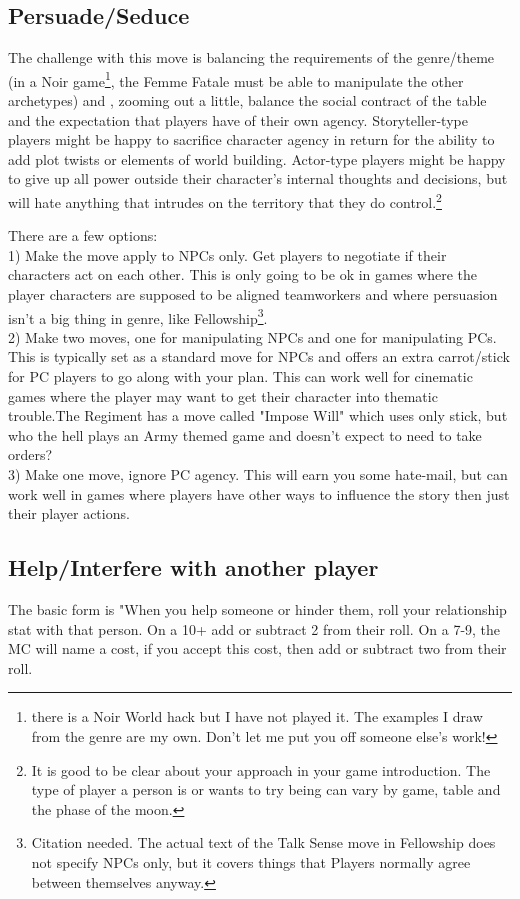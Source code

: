 \documentclass{tufte-handout}
\begin{document}
\subsection{Persuade/Seduce}
The challenge with this move is  balancing the requirements of the genre/theme (in a Noir game\footnote{there is a Noir World hack but I have not played it. The examples I draw from the genre are my own. Don't let me put you off someone else's work!}, the Femme Fatale must be able to manipulate the other archetypes) and , zooming out a little, balance the social contract of the table and the expectation that players have of their own agency. Storyteller-type players might be happy to sacrifice character agency in return for the ability to add plot twists or elements of world building. Actor-type players might be happy to give up all power outside their character's internal thoughts and decisions, but will hate anything that intrudes on the territory that they do control.\footnote{It is good to be clear about your approach in your game introduction. The type of player a person is or wants to try being can vary by game, table and the phase of the moon.}

There are a few options:\\
1) Make the move apply to NPCs only. Get players to negotiate if their characters act on each other. This is only going to be ok in games where the player characters are supposed to be aligned teamworkers and where persuasion isn't a big thing in genre, like Fellowship\footnote{Citation needed. The actual text of the Talk Sense move in Fellowship does not specify NPCs only, but it covers things that Players normally agree between themselves anyway.}. \\
2) Make two moves, one for manipulating NPCs and one for manipulating PCs. This is typically set as a standard move for NPCs and offers an extra carrot/stick for PC players to go along with your plan. This can work well for cinematic games where the player may want to get their character into thematic trouble.The Regiment has a move called "Impose Will" which uses only stick, but who the hell plays an Army themed game and doesn't expect to need to take orders?\\
3) Make one move, ignore PC agency. This will earn you some hate-mail, but can work well in games where players have other ways to influence the story then just their player actions. 

\subsection{Help/Interfere with another player}
The basic form is "When you help someone or hinder them, roll your relationship stat with that person. On a 10+ add or subtract 2 from their roll. On a 7-9, the MC will name a cost, if you accept this cost, then add or subtract two from their roll.
\end{document}
